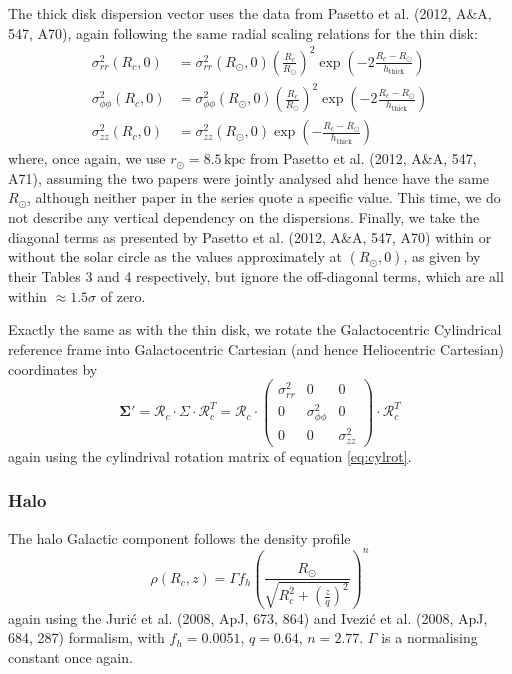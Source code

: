 \documentclass[fleqn,usenatbib]{mnras}
\begin{document}
The thick disk dispersion vector uses the data from Pasetto et al. (2012, A\&A, 547, A70), again following the same radial scaling relations for the thin disk:
\begin{align}
    \sigma_{rr}^2(R_c, 0) &= \sigma_{rr}^2(R_\odot, 0) \left(\frac{R_c}{R_\odot}\right)^2 \exp\left(-2\frac{R_c - R_\odot}{h_\mathrm{thick}}\right) \\
    \sigma_{\phi\phi}^2(R_c, 0) &= \sigma_{\phi\phi}^2(R_\odot, 0) \left(\frac{R_c}{R_\odot}\right)^2 \exp\left(-2\frac{R_c - R_\odot}{h_\mathrm{thick}}\right) \\
    \sigma_{zz}^2(R_c, 0) &= \sigma_{zz}^2(R_\odot, 0) \exp\left(-\frac{R_c - R_\odot}{h_\mathrm{thick}}\right)
\end{align}
where, once again, we use $r_\odot = 8.5\,\mathrm{kpc}$ from Pasetto et al. (2012, A\&A, 547, A71), assuming the two papers were jointly analysed ahd hence have the same $R_\odot$, although neither paper in the series quote a specific value.
This time, we do not describe any vertical dependency on the dispersions.
Finally, we take the diagonal terms as presented by Pasetto et al. (2012, A\&A, 547, A70) within or without the solar circle as the values approximately at $(R_\odot, 0)$, as given by their Tables 3 and 4 respectively, but ignore the off-diagonal terms, which are all within $\approx1.5\sigma$ of zero.

Exactly the same as with the thin disk, we rotate the Galactocentric Cylindrical reference frame into Galactocentric Cartesian (and hence Heliocentric Cartesian) coordinates by
\begin{equation}
    \bm{\Sigma}{'} = \bm{\mathcal{R}}_c \cdot \Sigma \cdot \bm{\mathcal{R}}_c^T = \bm{\mathcal{R}}_c \cdot \left(\begin{matrix} \sigma_{rr}^2 & 0 & 0 \\ 0 & \sigma_{\phi\phi}^2 & 0 \\ 0 & 0 & \sigma_{zz}^2 \end{matrix}\right) \cdot \bm{\mathcal{R}}_c^T
\end{equation}
again using the cylindrival rotation matrix of equation \ref{eq:cylrot}.

\subsubsection{Halo}
The halo Galactic component follows the density profile
\begin{equation}
    \rho(R_c, z) = \Gamma f_h \left(\frac{R_\odot}{\sqrt{R_c^2 + \left(\frac{z}{q}\right)^2}}\right)^n
\end{equation}
again using the Juri\'{c} et al. (2008, ApJ, 673, 864) and Ivezi\'{c} et al. (2008, ApJ, 684, 287) formalism, with $f_h = 0.0051$, $q = 0.64$, $n = 2.77$.
$\Gamma$ is a normalising constant once again.
\end{document}
